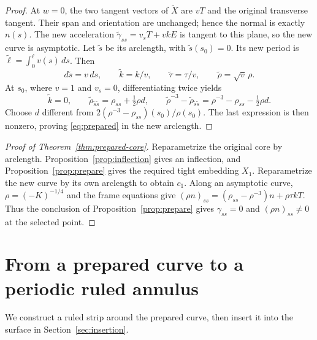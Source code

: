 \documentclass[11pt]{amsart}
\theoremstyle{definition}
\begin{document}
\begin{proof}
At $w=0$, the two tangent vectors of $\widetilde X$ are $vT$
and the original transverse tangent. Their span and orientation
are unchanged; hence the normal is exactly $n(s)$.
The new acceleration
$\widetilde\gamma_{ss}=v_sT+vkE$ is tangent to this plane,
so the new curve is asymptotic.
Let $\widetilde s$ be its arclength, with $\widetilde s(s_0)=0$.
Its new period is $\widetilde\ell=\int_0^\ell v(s)\,ds$.
Then
\[
 d\widetilde s=v\,ds,\qquad
 \widetilde k=k/v,\qquad
 \widetilde\tau=\tau/v,\qquad
 \widetilde\rho=\sqrt v\,\rho.
\]
At $s_0$, where $v=1$ and $v_s=0$, differentiating twice yields
\[
 \widetilde k=0,\qquad
 \widetilde\rho_{\widetilde s\widetilde s}=\rho_{ss}+\tfrac12\rho d,
 \qquad
 \widetilde\rho^{-3}-\widetilde\rho_{\widetilde s\widetilde s}
 =\rho^{-3}-\rho_{ss}-\tfrac12\rho d .
\]
Choose $d$ different from
$2(\rho^{-3}-\rho_{ss})(s_0)/\rho(s_0)$.
The last expression is then nonzero, proving
\eqref{eq:prepared} in the new arclength.
\end{proof}

\begin{proof}[Proof of Theorem~\ref{thm:prepared-core}]
Reparametrize the original core by arclength.
Proposition~\ref{prop:inflection} gives an inflection, and
Proposition~\ref{prop:prepare} gives the required tight embedding
$X_1$. Reparametrize the new curve by its own arclength to obtain
$c_1$. Along an asymptotic curve, $\rho=(-K)^{-1/4}$ and the frame
equations give
$(\rho n)_{ss}=(\rho_{ss}-\rho^{-3})n+\rho\tau kT$.
Thus the conclusion of Proposition~\ref{prop:prepare} gives
$\gamma_{ss}=0$ and $(\rho n)_{ss}\ne0$ at the selected point.
\end{proof}

\section{From a prepared curve to a periodic ruled annulus}
\label{sec:ruled}

We construct a ruled strip around the prepared curve, then insert
it into the surface in Section~\ref{sec:insertion}.
\end{document}
